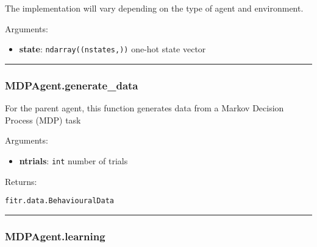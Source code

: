 The implementation will vary depending on the type of agent and
environment.

Arguments:

\begin{itemize}
\tightlist
\item
  \textbf{state}: \texttt{ndarray((nstates,))} one-hot state vector
\end{itemize}

\begin{center}\rule{0.5\linewidth}{\linethickness}\end{center}

\hypertarget{mdpagent.generate_data}{%
\subsubsection{MDPAgent.generate\_data}\label{mdpagent.generate_data}}

\begin{Shaded}
\begin{Highlighting}[]
\end{Highlighting}
\end{Shaded}

For the parent agent, this function generates data from a Markov
Decision Process (MDP) task

Arguments:

\begin{itemize}
\tightlist
\item
  \textbf{ntrials}: \texttt{int} number of trials
\end{itemize}

Returns:

\texttt{fitr.data.BehaviouralData}

\begin{center}\rule{0.5\linewidth}{\linethickness}\end{center}

\hypertarget{mdpagent.learning}{%
\subsubsection{MDPAgent.learning}\label{mdpagent.learning}}

\begin{Shaded}
\begin{Highlighting}[]
\end{Highlighting}
\end{Shaded}

